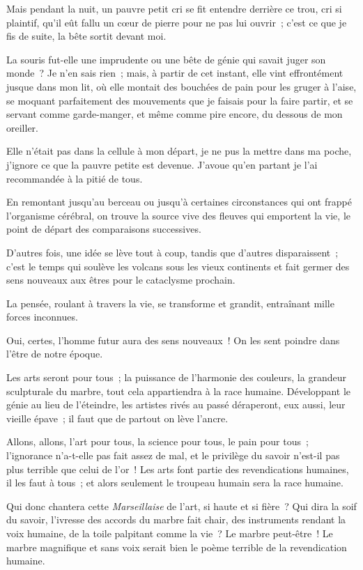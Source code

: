 \documentclass[french,twoside]{book} %
\begin{document}
Mais pendant la nuit, un pauvre petit cri se fit entendre derrière ce trou, cri si plaintif, qu’il eût fallu un cœur de pierre pour ne pas lui ouvrir ; c’est ce que je fis de suite, la bête sortit devant moi.\par
La souris fut-elle une imprudente ou une bête de génie qui savait juger son monde ? Je n’en sais rien ; mais, à partir de cet instant, elle vint effrontément jusque dans mon lit, où elle montait des bouchées de pain pour les gruger à l’aise, se moquant parfaitement des mouvements que je faisais pour la faire partir, et se servant comme garde-manger, et même comme pire encore, du dessous de mon oreiller.\par
Elle n’était pas dans la cellule à mon départ, je ne pus la mettre dans ma poche, j’ignore ce que la pauvre petite est devenue. J’avoue qu’en partant je l’ai recommandée à la pitié de tous.\par
En remontant jusqu’au berceau ou jusqu’à certaines circonstances qui ont frappé l’organisme cérébral, on trouve la source vive des fleuves qui emportent la vie, le point de départ des comparaisons successives.\par
 D’autres fois, une idée se lève tout à coup, tandis que d’autres disparaissent ; c’est le temps qui soulève les volcans sous les vieux continents et fait germer des sens nouveaux aux êtres pour le cataclysme prochain.\par
La pensée, roulant à travers la vie, se transforme et grandit, entraînant mille forces inconnues.\par
Oui, certes, l’homme futur aura des sens nouveaux ! On les sent poindre dans l’être de notre époque.\par
Les arts seront pour tous ; la puissance de l’harmonie des couleurs, la grandeur sculpturale du marbre, tout cela appartiendra à la race humaine. Développant le génie au lieu de l’éteindre, les artistes rivés au passé déraperont, eux aussi, leur vieille épave ; il faut que de partout on lève l’ancre.\par
Allons, allons, l’art pour tous, la science pour tous, le pain pour tous ; l’ignorance n’a-t-elle pas fait assez de mal, et le privilège du savoir n’est-il pas plus terrible que celui de l’or ! Les arts font partie des revendications humaines, il les faut à tous ; et alors seulement le troupeau humain sera la race humaine.\par
Qui donc chantera cette \emph{Marseillaise} de l’art, si haute et si fière ? Qui dira la soif du savoir,  l’ivresse des accords du marbre fait chair, des instruments rendant la voix humaine, de la toile palpitant comme la vie ? Le marbre peut-être ! Le marbre magnifique et sans voix serait bien le poème terrible de la revendication humaine.\par
\end{document}
